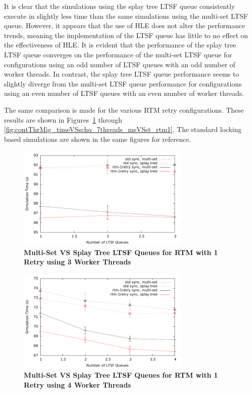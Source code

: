 \documentclass[11pt]{book}
\begin{document}
It is clear that the simulations using the splay tree LTSF queue consistently
execute in slightly less time than the same simulations using the multi-set LTSF
queue.  However, it appears that the use of HLE does not alter the performance
trends, meaning the implementation of the LTSF queue has little to no effect on
the effectiveness of HLE.  It is evident that the performance of the splay tree
LTSF queue converges on the performance of the multi-set LTSF queue for
configurations using an odd number of LTSF queues with an odd number of worker
threads.  In contrast, the splay tree LTSF queue performance seems to slightly
diverge from the multi-set LTSF queue performance for configurations using an
even number of LTSF queues with an even number of worker threads.

The same comparison is made for the various RTM retry configurations.  These
results are shown in
Figures~\ref{fig:contThrMig_timeVSschq_3threads_msVSst_rtm1} through
\ref{fig:contThrMig_timeVSschq_7threads_msVSst_rtm1}.  The standard locking
based simulations are shown in the same figures for reference.

\begin{figure}
    \centering
    \graphicspath{ {./figures/} }
    \includegraphics[width=0.75\textwidth,keepaspectratio]{hugeepidemicsim-CONTmig-timeVSschedQs-msVSst-3thread-rtm-1retry}
\caption{\textbf{Multi-Set VS Splay Tree LTSF Queues for RTM with 1 Retry
     using 3 Worker Threads}}\label{fig:contThrMig_timeVSschq_3threads_msVSst_rtm1}
\end{figure}

\begin{figure}
    \centering
    \graphicspath{ {./figures/} }
    \includegraphics[width=0.75\textwidth,keepaspectratio]{hugeepidemicsim-CONTmig-timeVSschedQs-msVSst-4thread-rtm-1retry}
\caption{\textbf{Multi-Set VS Splay Tree LTSF Queues for RTM with 1 Retry
     using 4 Worker Threads}}\label{fig:contThrMig_timeVSschq_4threads_msVSst_rtm1}
\end{figure}
\end{document}
